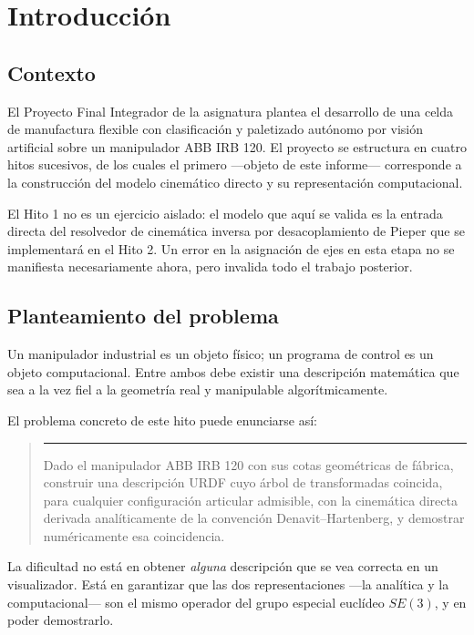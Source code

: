 \documentclass[11pt,a4paper]{article}
\newenvironment{nota}
  {\begin{quote}\small\color{oscuro}\rule{2pt}{\baselineskip}\hspace{6pt}\ignorespaces}
  {\end{quote}}
\begin{document}
\section{Introducción}

\subsection{Contexto}

El Proyecto Final Integrador de la asignatura plantea el desarrollo de
una celda de manufactura flexible con clasificación y paletizado
autónomo por visión artificial sobre un manipulador ABB IRB 120. El
proyecto se estructura en cuatro hitos sucesivos, de los cuales el
primero —objeto de este informe— corresponde a la construcción del
modelo cinemático directo y su representación computacional.

El Hito 1 no es un ejercicio aislado: el modelo que aquí se valida es la
entrada directa del resolvedor de cinemática inversa por desacoplamiento
de Pieper que se implementará en el Hito 2. Un error en la asignación de
ejes en esta etapa no se manifiesta necesariamente ahora, pero invalida
todo el trabajo posterior.

\subsection{Planteamiento del problema}

Un manipulador industrial es un objeto físico; un programa de control es
un objeto computacional. Entre ambos debe existir una descripción
matemática que sea a la vez fiel a la geometría real y manipulable
algorítmicamente.

El problema concreto de este hito puede enunciarse así:

\begin{nota}
Dado el manipulador ABB IRB 120 con sus cotas geométricas de fábrica,
construir una descripción URDF cuyo árbol de transformadas coincida, para
cualquier configuración articular admisible, con la cinemática directa
derivada analíticamente de la convención Denavit--Hartenberg, y demostrar
numéricamente esa coincidencia.
\end{nota}

La dificultad no está en obtener \emph{alguna} descripción que se vea
correcta en un visualizador. Está en garantizar que las dos
representaciones —la analítica y la computacional— son el mismo operador
del grupo especial euclídeo $SE(3)$, y en poder demostrarlo.
\end{document}
